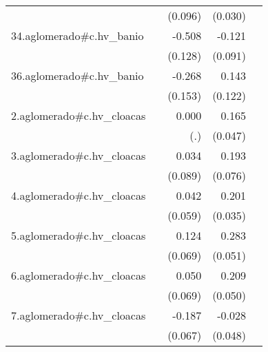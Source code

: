 {\begin{longtable}{l*{4}{D{.}{.}{-1}}}
            &                     &     (0.096)         &     (0.030)         &                     \\
\addlinespace
34.aglomerado#c.hv\_banio&                     &      -0.508\sym{***}&      -0.121         &                     \\
            &                     &     (0.128)         &     (0.091)         &                     \\
\addlinespace
36.aglomerado#c.hv\_banio&                     &      -0.268         &       0.143         &                     \\
            &                     &     (0.153)         &     (0.122)         &                     \\
\addlinespace
2.aglomerado#c.hv\_cloacas&                     &       0.000         &       0.165\sym{***}&                     \\
            &                     &         (.)         &     (0.047)         &                     \\
\addlinespace
3.aglomerado#c.hv\_cloacas&                     &       0.034         &       0.193\sym{*}  &                     \\
            &                     &     (0.089)         &     (0.076)         &                     \\
\addlinespace
4.aglomerado#c.hv\_cloacas&                     &       0.042         &       0.201\sym{***}&                     \\
            &                     &     (0.059)         &     (0.035)         &                     \\
\addlinespace
5.aglomerado#c.hv\_cloacas&                     &       0.124         &       0.283\sym{***}&                     \\
            &                     &     (0.069)         &     (0.051)         &                     \\
\addlinespace
6.aglomerado#c.hv\_cloacas&                     &       0.050         &       0.209\sym{***}&                     \\
            &                     &     (0.069)         &     (0.050)         &                     \\
\addlinespace
7.aglomerado#c.hv\_cloacas&                     &      -0.187\sym{**} &      -0.028         &                     \\
            &                     &     (0.067)         &     (0.048)         &                     \\

\end{longtable}}
